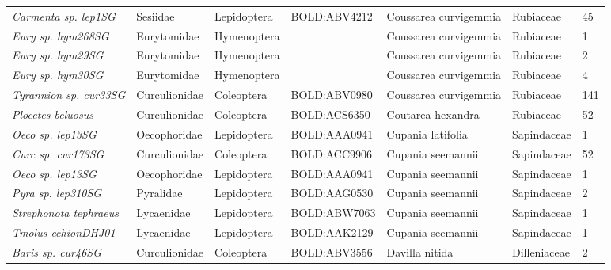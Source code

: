 \documentclass[11pt]{article}
\begin{document}
\begin{landscape}
\begin{longtable}{@{}lllllll@{}}
\textit{Carmenta sp. lep1SG}                          & Sesiidae        & Lepidoptera  & BOLD:ABV4212 & Coussarea curvigemmia              & Rubiaceae        & 45    \\
\textit{Eury sp. hym268SG}                            & Eurytomidae     & Hymenoptera  &              & Coussarea curvigemmia              & Rubiaceae        & 1     \\
\textit{Eury sp. hym29SG}                             & Eurytomidae     & Hymenoptera  &              & Coussarea curvigemmia              & Rubiaceae        & 2     \\
\textit{Eury sp. hym30SG}                             & Eurytomidae     & Hymenoptera  &              & Coussarea curvigemmia              & Rubiaceae        & 4     \\
\textit{Tyrannion sp. cur33SG}                        & Curculionidae   & Coleoptera   & BOLD:ABV0980 & Coussarea curvigemmia              & Rubiaceae        & 141   \\
\textit{Plocetes beluosus}                            & Curculionidae   & Coleoptera   & BOLD:ACS6350 & Coutarea hexandra                  & Rubiaceae        & 52    \\
\textit{Oeco sp. lep13SG}                             & Oecophoridae    & Lepidoptera  & BOLD:AAA0941 & Cupania latifolia                  & Sapindaceae      & 1     \\
\textit{Curc sp. cur173SG}                            & Curculionidae   & Coleoptera   & BOLD:ACC9906 & Cupania seemannii                  & Sapindaceae      & 52    \\
\textit{Oeco sp. lep13SG}                             & Oecophoridae    & Lepidoptera  & BOLD:AAA0941 & Cupania seemannii                  & Sapindaceae      & 1     \\
\textit{Pyra sp. lep310SG}                            & Pyralidae       & Lepidoptera  & BOLD:AAG0530 & Cupania seemannii                  & Sapindaceae      & 2     \\
\textit{Strephonota tephraeus}                        & Lycaenidae      & Lepidoptera  & BOLD:ABW7063 & Cupania seemannii                  & Sapindaceae      & 1     \\
\textit{Tmolus echionDHJ01}                           & Lycaenidae      & Lepidoptera  & BOLD:AAK2129 & Cupania seemannii                  & Sapindaceae      & 1     \\
\textit{Baris sp. cur46SG}                            & Curculionidae   & Coleoptera   & BOLD:ABV3556 & Davilla nitida                     & Dilleniaceae     & 2     \\

\end{longtable}
\end{landscape}
\end{document}
